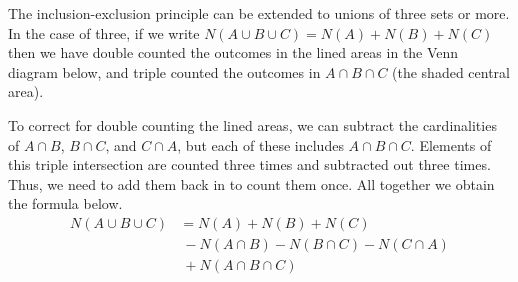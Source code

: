 The inclusion-exclusion principle can be extended to unions of three sets or more. In the case of three, if we write $N(A \cup B \cup C) = N(A) + N(B) + N(C)$ then we have double counted the outcomes in the lined areas in the Venn diagram below, and triple counted the outcomes in $A \cap B \cap C$ (the shaded central area).

\begin{center}
\end{center}

To correct for double counting the lined areas, we can subtract the cardinalities of $A \cap B$, $B \cap C$, and $C \cap A$, but each of these includes $A \cap B \cap C$. Elements of this triple intersection are counted three times and subtracted out three times. Thus, we need to add them back in to count them once. All together we obtain the formula below.
$$\begin{aligned}
N(A \cup B \cup C) &= N(A) + N(B) + N(C)\\ &\  - N(A \cap B) - N(B \cap C) - N(C \cap A) \\ & \ + N(A \cap B \cap C)
\end{aligned}$$

